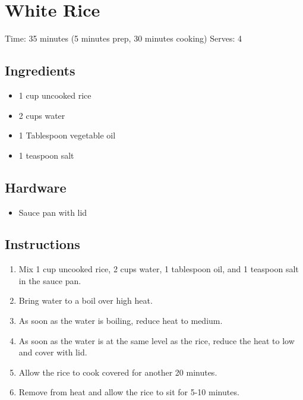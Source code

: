 \section{White Rice}
\label{whiteRice}
\setcounter{secnumdepth}{0}
Time: 35 minutes (5 minutes prep, 30 minutes cooking)
Serves: 4

\begin{multicols}{2}
\subsection*{Ingredients}
\begin{itemize}
    \item 1 cup uncooked rice
    \item 2 cups water
    \item 1 Tablespoon vegetable oil
    \item 1 teaspoon salt
\end{itemize}

\subsection*{Hardware}
\begin{itemize}
    \item Sauce pan with lid
\end{itemize}
\clearpage

\subsection*{Instructions}
\begin{enumerate}
    \item Mix 1 cup uncooked rice, 2 cups water, 1 tablespoon oil, and 1 teaspoon salt in the sauce pan.
    \item Bring water to a boil over high heat.
    \item As soon as the water is boiling, reduce heat to medium.
    \item As soon as the water is at the same level as the rice, reduce the heat to low and cover with lid.
    \item Allow the rice to cook covered for another 20 minutes.
    \item Remove from heat and allow the rice to sit for 5-10 minutes.

\end{enumerate}


\end{multicols}
